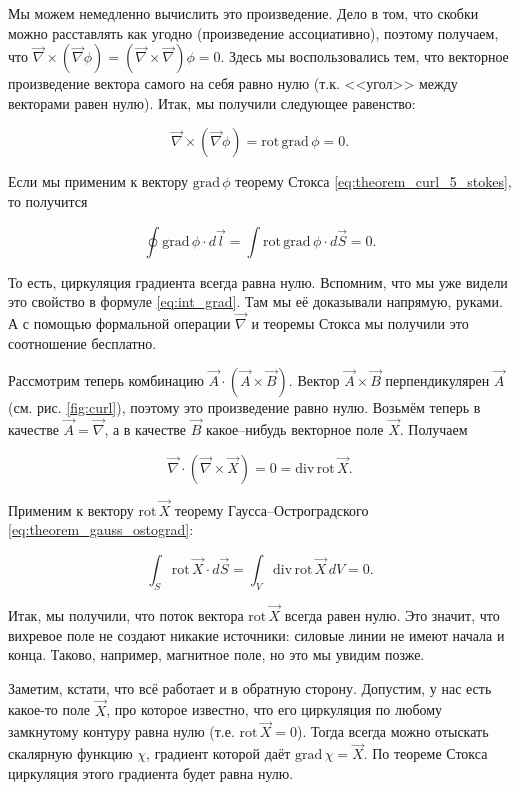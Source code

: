 \documentclass[a4paper,12pt]{article}
\numberwithin{equation}{section}
\newcommand{\grad}{\mathrm{grad}\,}
\newcommand{\rot}{\mathrm{rot}\,}
\renewcommand{\div}{\mathrm{div}\,}
\newcommand{\vn}{\vec{\nabla}}
\begin{document}
Мы можем немедленно вычислить это произведение. Дело в том, что скобки
можно расставлять как угодно (произведение ассоциативно), поэтому
получаем, что $\vn \times (\vn \phi) = (\vn \times \vn) \phi
=0$. Здесь мы воспользовались тем, что векторное произведение вектора
самого на себя равно нулю (т.к. <<угол>> между векторами равен
нулю). Итак, мы получили следующее равенство: 

\begin{equation}
  \label{eq:rot_grad}
  \vn \times (\vn \phi) = \rot \grad \phi = 0.
\end{equation}

Если мы применим к вектору $\grad \phi$ теорему Стокса
\eqref{eq:theorem_curl_5_stokes}, то получится

\begin{equation}
  \label{eq:stokes_gradient}
  \oint \grad \phi \cdot d\vec{l} = \int \rot \grad \phi \cdot
  d\vec{S} = 0.
\end{equation}

То есть, циркуляция градиента всегда равна нулю. Вспомним, что мы уже
видели это свойство в формуле \eqref{eq:int_grad}. Там мы её
доказывали напрямую, руками. А с помощью формальной операции $\vn$ и
теоремы Стокса мы получили это соотношение бесплатно.

Рассмотрим теперь комбинацию $ \vec{A} \cdot (\vec{A} \times
\vec{B})$. Вектор $\vec{A} \times \vec{B}$ перпендикулярен $\vec{A}$
(см. рис. \ref{fig:curl}), поэтому это произведение равно
нулю. Возьмём теперь в качестве $\vec{A} = \vn$, а в качестве
$\vec{B}$ какое--нибудь векторное поле $\vec{X}$. Получаем

\begin{equation}
  \label{eq:div_rot}
  \vn \cdot (\vn \times \vec{X}) = 0 = \div \rot \vec{X}.
\end{equation}

Применим к вектору $\rot \vec{X}$ теорему Гаусса--Остроградского
\eqref{eq:theorem_gauss_ostograd}:

\begin{equation}
  \label{eq:gauss_rot}
  \int_S \rot \vec{X} \cdot d\vec{S} = \int_V \div \rot \vec{X}\, dV = 0.
\end{equation}

Итак, мы получили, что поток вектора $\rot \vec{X}$ всегда равен
нулю. Это значит, что вихревое поле не создают никакие источники:
силовые линии не имеют начала и конца. Таково, например, магнитное
поле, но это мы увидим позже.

Заметим, кстати, что всё работает и в обратную сторону. Допустим, у
нас есть какое-то поле $\vec{X}$, про которое известно, что его
циркуляция по любому замкнутому контуру равна нулю (т.е. $\rot \vec{X}
=0$). Тогда всегда можно отыскать скалярную функцию $\chi$, градиент
которой даёт $\grad \chi = \vec{X}$. По теореме Стокса циркуляция
этого градиента будет равна нулю. 
\end{document}
